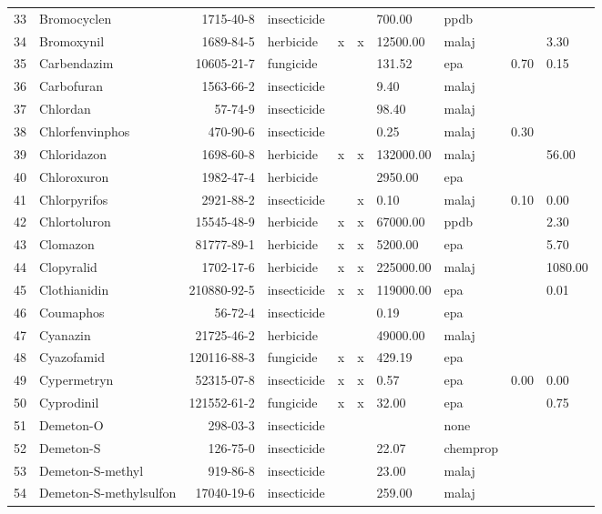 \begin{longtable}{lp{3cm}rlp{0.5cm}p{0.5cm}p{1.5cm}p{1cm}p{1cm}p{1cm}}
  33 & Bromocyclen & 1715-40-8 & insecticide &  &  & 700.00 & ppdb &  &  \\ 
  34 & Bromoxynil & 1689-84-5 & herbicide & x & x & 12500.00 & malaj &  & 3.30 \\ 
  35 & Carbendazim & 10605-21-7 & fungicide &  &  & 131.52 & epa & 0.70 & 0.15 \\ 
  36 & Carbofuran & 1563-66-2 & insecticide &  &  & 9.40 & malaj &  &  \\ 
  37 & Chlordan & 57-74-9 & insecticide &  &  & 98.40 & malaj &  &  \\ 
  38 & Chlorfenvinphos & 470-90-6 & insecticide &  &  & 0.25 & malaj & 0.30 &  \\ 
  39 & Chloridazon & 1698-60-8 & herbicide & x & x & 132000.00 & malaj &  & 56.00 \\ 
  40 & Chloroxuron & 1982-47-4 & herbicide &  &  & 2950.00 & epa &  &  \\ 
  41 & Chlorpyrifos & 2921-88-2 & insecticide &  & x & 0.10 & malaj & 0.10 & 0.00 \\ 
  42 & Chlortoluron & 15545-48-9 & herbicide & x & x & 67000.00 & ppdb &  & 2.30 \\ 
  43 & Clomazon & 81777-89-1 & herbicide & x & x & 5200.00 & epa &  & 5.70 \\ 
  44 & Clopyralid & 1702-17-6 & herbicide & x & x & 225000.00 & malaj &  & 1080.00 \\ 
  45 & Clothianidin & 210880-92-5 & insecticide & x & x & 119000.00 & epa &  & 0.01 \\ 
  46 & Coumaphos & 56-72-4 & insecticide &  &  & 0.19 & epa &  &  \\ 
  47 & Cyanazin & 21725-46-2 & herbicide &  &  & 49000.00 & malaj &  &  \\ 
  48 & Cyazofamid & 120116-88-3 & fungicide & x & x & 429.19 & epa &  &  \\ 
  49 & Cypermetryn & 52315-07-8 & insecticide & x & x & 0.57 & epa & 0.00 & 0.00 \\ 
  50 & Cyprodinil & 121552-61-2 & fungicide & x & x & 32.00 & epa &  & 0.75 \\ 
  51 & Demeton-O & 298-03-3 & insecticide &  &  &  & none &  &  \\ 
  52 & Demeton-S & 126-75-0 & insecticide &  &  & 22.07 & chemprop &  &  \\ 
  53 & Demeton-S-methyl & 919-86-8 & insecticide &  &  & 23.00 & malaj &  &  \\ 
  54 & Demeton-S-methylsulfon & 17040-19-6 & insecticide &  &  & 259.00 & malaj &  &  \\ 

\end{longtable}

